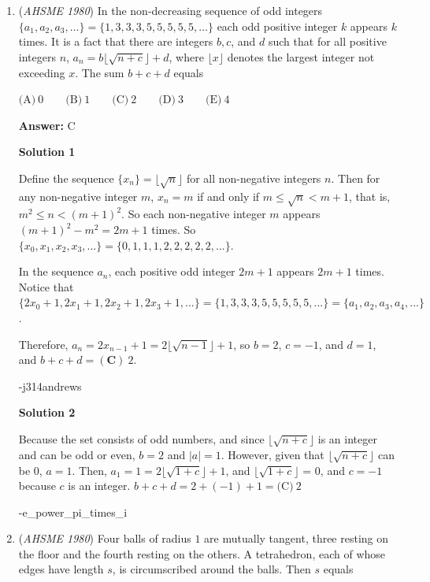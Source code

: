 \begin{enumerate}
 -j314andrews

 


	\item (\textit{AHSME 1980}) In the non-decreasing sequence of odd integers $\{a_1,a_2,a_3,\ldots \}=\{1,3,3,3,5,5,5,5,5,\ldots \}$ each odd positive integer $k$
appears $k$ times. It is a fact that there are integers $b, c$, and $d$ such that for all positive integers $n$, 
$a_n=b\lfloor \sqrt{n+c} \rfloor +d$, 
where $\lfloor x \rfloor$ denotes the largest integer not exceeding $x$. The sum $b+c+d$ equals 


 $\text{(A)} \ 0 \qquad  \text{(B)} \ 1 \qquad  \text{(C)} \ 2 \qquad  \text{(D)} \ 3 \qquad  \text{(E)} \ 4$

 \textbf{Answer: }C



\textbf{Solution 1}

Define the sequence $\{x_n\} = \lfloor\sqrt{n}\rfloor$ for all non-negative integers $n$.  Then for any non-negative integer $m$, $x_n = m$ if and only if $m \leq \sqrt{n} < m+1$, that is, $m^2 \leq n < (m+1)^2$.  So each non-negative integer $m$ appears $(m+1)^2 - m^2 = 2m+1$ times.  So $\{x_0, x_1, x_2, x_3, ...\} = \{0, 1, 1, 1, 2, 2, 2, 2, 2, ...\}$.  

 In the sequence $a_n$, each positive odd integer $2m+1$ appears $2m+1$ times.  Notice that $\{2x_0 + 1, 2x_1 + 1, 2x_2 + 1, 2x_3 + 1, ...\} = \{1, 3, 3, 3, 5, 5, 5, 5, 5, ...\} = \{a_1, a_2, a_3, a_4, ...\}$.  

 Therefore, $a_n = 2x_{n-1} + 1 = 2\lfloor{\sqrt{n-1}}\rfloor + 1$, so $b = 2$, $c = -1$, and $d = 1$, and $b + c + d = \boxed{(\textbf{C})\ 2}$.

 -j314andrews

 



\textbf{Solution 2}

Because the set consists of odd numbers, and since $\lfloor{}\sqrt{n+c}\rfloor{}$ is an integer and can be odd or even, $b = 2$ and $|a| = 1$. However, given that $\lfloor{}\sqrt{n+c}\rfloor{}$ can be $0$, $a = 1$. Then, $a_1 = 1 = 2\lfloor{}\sqrt{1+c}\rfloor{}+1$, and $\lfloor{}\sqrt{1+c}\rfloor{}$ = 0, and $c = -1$ because $c$ is an integer. $b+c+d = 2+(-1)+1 = \boxed{\text{(C)}\  2}$

 -e\_power\_pi\_times\_i

 


	\item (\textit{AHSME 1980}) Four balls of radius $1$ are mutually tangent, three resting on the floor and the fourth resting on the others. 
A tetrahedron, each of whose edges have length $s$, is circumscribed around the balls. Then $s$ equals 



\end{enumerate}

